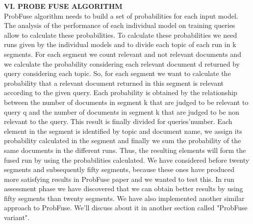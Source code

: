 \documentclass[12pt,journal]{IEEEtran}
\begin{document}
\textbf{VI.	PROBE FUSE ALGORITHM} \\
ProbFuse algorithm needs to build a set of probabilities for each input model. 
The analysis of the performance of each individual model on training queries allow to calculate these probabilities. 
To calculate these probabilities we need runs given by the individual models and to divide each topic of each run in k segments. For each segment we count relevant and not relevant documents and we calculate the probability considering each relevant document d returned by query considering each topic. 
So, for each segment we want to calculate the probability that a relevant document returned in this segment is relevant according to the given query. Each probability is obtained by the relationship between the number of documents in segment k that are judged to be relevant to query q and the number of documents in segment k that are judged to be non relevant to the query. This result is finally divided for queries'number.
Each element in the segment is identified by topic and document name, we assign its probability calculated in the segment and finally we sum the probability of the same documents in the different runs.
Thus, the resulting elements will form the fused run by using the probabilities calculated. 
We have considered before twenty segments and subsequently fifty segments, because these ones have produced more satisfying results in ProbFuse paper and we wanted to test this. In run assessment phase we have discovered that we can obtain better results by using fifty segments than twenty segments. We have also implemented another similar approach to ProbFuse. We'll discuss about it in another section called "ProbFuse variant". \\
\end{document}
